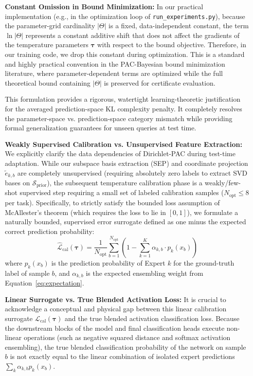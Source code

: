 \textbf{Constant Omission in Bound Minimization:} In our practical implementation (e.g., in the optimization loop of \texttt{run\_experiments.py}), because the parameter-grid cardinality $|\Theta|$ is a fixed, data-independent constant, the term $\ln |\Theta|$ represents a constant additive shift that does not affect the gradients of the temperature parameters $\boldsymbol{\tau}$ with respect to the bound objective. Therefore, in our training code, we drop this constant during optimization. This is a standard and highly practical convention in the PAC-Bayesian bound minimization literature, where parameter-dependent terms are optimized while the full theoretical bound containing $|\Theta|$ is preserved for certificate evaluation.

This formulation provides a rigorous, watertight learning-theoretic justification for the averaged prediction-space KL complexity penalty. It completely resolves the parameter-space vs. prediction-space category mismatch while providing formal generalization guarantees for unseen queries at test time.

\textbf{Weakly Supervised Calibration vs. Unsupervised Feature Extraction:}
We explicitly clarify the data dependencies of Dirichlet-PAC during test-time adaptation. While our subspace basis extraction (SEP) and coordinate projection $\tilde{e}_{k, b}$ are completely unsupervised (requiring absolutely zero labels to extract SVD bases on $\mathcal{S}_{\text{prior}}$), the subsequent temperature calibration phase is a weakly/few-shot supervised step requiring a small set of labeled calibration samples ($N_{\text{opt}} \le 8$ per task). Specifically, to strictly satisfy the bounded loss assumption of McAllester's theorem (which requires the loss to lie in $[0, 1]$), we formulate a naturally bounded, supervised error surrogate defined as one minus the expected correct prediction probability:
\begin{equation}
  \widehat{\mathcal{L}}_{\text{cal}}(\boldsymbol{\tau}) = \frac{1}{N_{\text{opt}}} \sum_{b=1}^{N_{\text{opt}}} \left( 1 - \sum_{k=1}^K \alpha_{k, b} \cdot p_k(x_b) \right)
  \label{eq:empirical_loss}
\end{equation}
where $p_k(x_b)$ is the prediction probability of Expert $k$ for the ground-truth label of sample $b$, and $\alpha_{k, b}$ is the expected ensembling weight from Equation~\eqref{eq:expectation}.

\textbf{Linear Surrogate vs. True Blended Activation Loss:}
It is crucial to acknowledge a conceptual and physical gap between this linear calibration surrogate $\widehat{\mathcal{L}}_{\text{cal}}(\boldsymbol{\tau})$ and the true blended activation classification loss. Because the downstream blocks of the model and final classification heads execute non-linear operations (such as negative squared distance and softmax activation ensembling), the true blended classification probability of the network on sample $b$ is not exactly equal to the linear combination of isolated expert predictions $\sum_k \alpha_{k, b} p_k(x_b)$. 

